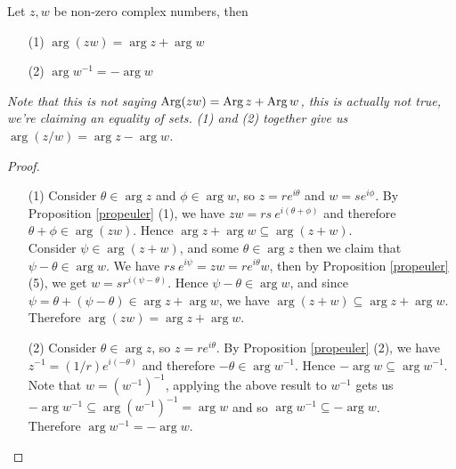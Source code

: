 \vspace*{1em}

\begin{proposition}\label{prodarg}
Let $z,w$ be non-zero complex numbers, then
\begin{itemize}
\item[(1)] $\arg (zw) = \arg z + \arg w$
\item[(2)] $\arg w^{-1} = -\arg w$
\end{itemize}
\emph{Note that this is \emph{not} saying $\operatorname{Arg}(zw) = \operatorname{Arg} z + \operatorname{Arg} w$, this is actually not true, we're claiming an equality of sets. (1) and (2) together give us $\arg (z/w) = \arg z - \arg w$.}
\end{proposition}
\begin{proof}\hfill
\begin{itemize}
\item[(1)] Consider $\theta \in \arg z$ and $\phi \in \arg w$, so $z = re^{i\theta}$ and $w = se^{i\phi}$. By Proposition \ref{propeuler} (1), we have $zw = rs\ e^{i(\theta + \phi)}$ and therefore $\theta + \phi \in \arg(zw)$. Hence $\arg z + \arg w \subseteq \arg(z + w)$.\\[0.5em]
Consider $\psi \in \arg(z+w)$, and some $\theta \in \arg z$ then we claim that $\psi - \theta \in \arg w$. We have $rs\ e^{i\psi} = zw = re^{i\theta}w$, then by Proposition \ref{propeuler} (5), we get $w = sr^{i(\psi - \theta)}$. Hence $\psi - \theta \in \arg w$, and since $\psi = \theta + (\psi - \theta) \in \arg z + \arg w$, we have $\arg(z+w) \subseteq \arg z + \arg w$.\\[0.5em]
Therefore $\arg (zw) = \arg z + \arg w$.
\item[(2)] Consider $\theta \in \arg z$, so $z = re^{i\theta}$. By Proposition \ref{propeuler} (2), we have $z^{-1} = (1/r)e^{i(-\theta)}$ and therefore $-\theta \in \arg w^{-1}$. Hence $-\arg w \subseteq \arg w^{-1}$.\\[0.5em]
Note that $w = (w^{-1})^{-1}$, applying the above result to $w^{-1}$ gets us $-\arg w^{-1} \subseteq \arg (w^{-1})^{-1} = \arg w$ and so $\arg w^{-1} \subseteq - \arg w$.\\[0.5em]
Therefore $\arg w^{-1} = -\arg w$.
\end{itemize}
\vspace*{-\baselineskip}
\end{proof}

\vspace*{1em}

